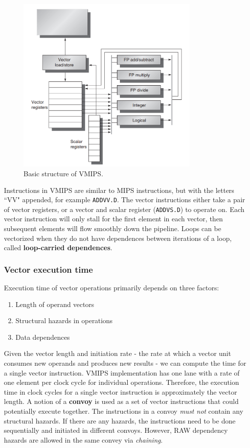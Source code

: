 \documentclass[11pt]{article}
\begin{document}
\begin{figure}[H]
\centering
\includegraphics[width=0.8\textwidth, keepaspectratio]{imgs/vmips.png}
\caption{Basic structure of VMIPS.}
\end{figure}
\noindent
Instructions in VMIPS are similar to MIPS instructions, but with the letters ``VV" appended, for example \texttt{ADDVV.D}. The vector instructions either take a pair of vector registers, or a vector and scalar register (\texttt{ADDVS.D}) to operate on. Each vector instruction will only stall for the first element in each vector, then subsequent elements will flow smoothly down the pipeline. Loops can be vectorized when they do not have dependences between iterations of a loop, called \textbf{loop-carried dependences}.

\subsubsection{Vector execution time}
Execution time of vector operations primarily depends on three factors:
\begin{enumerate}
\item Length of operand vectors
\item Structural hazards in operations
\item Data dependences
\end{enumerate}
Given the vector length and initiation rate - the rate at which a vector unit consumes new operands and produces new results - we can compute the time for a single vector instruction. VMIPS implementation has one lane with a rate of one element per clock cycle for individual operations. Therefore, the execution time in clock cycles for a single vector instruction is approximately the vector length. 
\n
A notion of a \textbf{convoy} is used as a set of vector instructions that could potentially execute together. The instructions in a convoy \textit{must not} contain any structural hazards. If there are any hazards, the instructions need to be done sequentially and initiated in different convoys. However, RAW dependency hazards are allowed in the same convey via \textit{chaining}.
\end{document}
